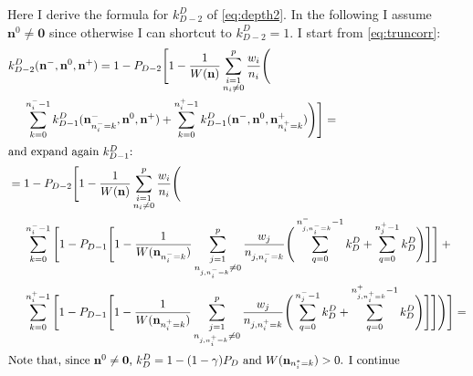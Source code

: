 \documentclass[a4paper]{article}
\newcommand{\nvecs}{\mathbf n^-, \mathbf n^0, \mathbf n^+}
\theoremstyle{definition}
\begin{document}
    Here I derive the formula for $k^D_{D-2}$ of \autoref{eq:depth2}. In the
    following I assume $\mathbf n^0 \ne \mathbf 0$ since otherwise I can
    shortcut to $k^D_{D-2} = 1$. I start from \autoref{eq:truncorr}:
    \begin{align}
        &k^D_{D-2}(\nvecs) =
        1 - P_{D-2} \Bigg[
            1 - \frac 1 {W(\mathbf n)} \sum_{\substack{i=1 \\ n_i \ne 0}}^p
            \frac {w_i} {n_i} \Bigg( \notag \\
                & \phantom{{}={}}
                \sum_{k=0}^{n^-_i-1}
                k^D_{D-1}(\mathbf n^-_{n^-_i=k}, \mathbf n^0, \mathbf n^+) +
                \sum_{k=0}^{n^+_i-1}
                k^D_{D-1}(\mathbf n^-, \mathbf n^0, \mathbf n^+_{n^+_i=k})
            \Bigg)
        \Bigg] = \notag \\
        \intertext{and expand again $k^D_{D-1}$:}
        &= 1 - P_{D-2} \Bigg[
            1 - \frac 1 {W(\mathbf n)}
            \sum_{\substack{i=1 \\ n_i \ne 0}}^p \frac {w_i} {n_i} \Bigg( \notag \\
                & \phantom{{}={}}
                \sum_{k=0}^{n^-_i - 1} \Bigg[
                    1 - P_{D-1} \Bigg[
                        1 - \frac 1 {W(\mathbf n_{n^-_i=k})}
                        \sum_{\substack{j=1 \\ n_{j,n^-_i=k} \ne 0}}^p
                        \frac {w_j} {n_{j,n^-_i=k}} \Bigg(
                            \sum_{q=0}^{n^-_{j,n^-_i=k} - 1} k^D_D +
                            \sum_{q=0}^{n^+_j - 1} k^D_D
                        \Bigg)
                    \Bigg]
                \Bigg] + {} \notag \\
                & \phantom{{}={}}
                \sum_{k=0}^{n^+_i - 1} \Bigg[
                    1 - P_{D-1} \Bigg[
                        1 - \frac 1 {W(\mathbf n_{n^+_i=k})}
                        \sum_{\substack{j=1 \\ n_{j,n^+_i=k} \ne 0}}^p
                        \frac {w_j} {n_{j,n^+_i=k}} \Bigg(
                            \sum_{q=0}^{n^-_j - 1} k^D_D +
                            \sum_{q=0}^{n^+_{j,n^+_i=k} - 1} k^D_D
                        \Bigg)
                    \Bigg]
                \Bigg]
            \Bigg)
        \Bigg] = \notag \\
        \intertext{Note that, since $\mathbf n^0 \ne \mathbf 0$, $k^D_D = 1 -
        (1 - \gamma) P_D$ and $W(\mathbf n_{n^*_i=k}) > 0$. I continue
}
\end{align}
\end{document}
